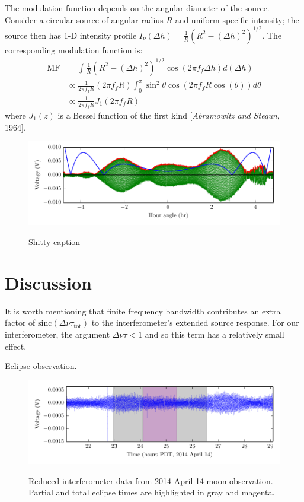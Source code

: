 \documentclass[10pt]{article}
\newcommand {\mt}{\mathrm}
\begin{document}
The modulation function depends on the angular diameter of the source.  Consider a circular source of angular radius $R$ and uniform specific intensity; the source then has 1-D intensity profile $I_\nu(\Delta h) = \frac{1}{R} \left( R^2 - (\Delta h)^2 \right)^{1/2}$.  The corresponding modulation function is:
\begin{align*}
    \mathrm{MF} &= \int \frac{1}{R} \left( R^2 - (\Delta h)^2 \right)^{1/2} \cos(2\pi f_f \Delta h) d(\Delta h) \\
                &\propto \frac{1}{2\pi f_f R} \left(2\pi f_f R\right)
                         \int_0^\pi \sin^2 \theta \cos\left(2\pi f_f R \cos(\theta)\right) d\theta \\
                &\propto \frac{1}{2\pi f_f R} J_1 \left(2\pi f_f R \right)
\end{align*}
where $J_1(z)$ is a Bessel function of the first kind [\textit{Abramowitz and Stegun}, 1964].

\begin{figure}[!ht]
    \centering
    \includegraphics[scale=1]{plots_fitting/sun_fringes_envelopes.pdf} \\
    \caption{Shitty caption}
	\label{fig:sunFringes}
\end{figure}

\section{Discussion}

It is worth mentioning that finite frequency bandwidth contributes an extra factor of $\mathrm{sinc} (\Delta\nu \tau_{\mt{tot}})$ to the interferometer's extended source response.  For our interferometer, the argument $\Delta\nu\tau < 1$ and so this term has a relatively small effect.

Eclipse observation.

\begin{figure}[!ht]
    \centering
    \includegraphics{plots/moon_eclipse_nice_clean.pdf} \\
    \caption{Reduced interferometer data from 2014 April 14 moon observation.  Partial and total eclipse times are highlighted in gray and magenta.}
    \label{fig:eclipse}
\end{figure}
\end{document}
